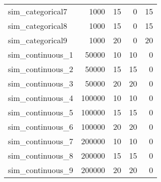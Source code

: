 \begin{tabular}{lrrrr}
  sim\_categorical7 & 1000 &  15 &   0 &  15 \\ 
  sim\_categorical8 & 1000 &  15 &   0 &  15 \\ 
  sim\_categorical9 & 1000 &  20 &   0 &  20 \\ 
  sim\_continuous\_1 & 50000 &  10 &  10 &   0 \\ 
  sim\_continuous\_2 & 50000 &  15 &  15 &   0 \\ 
  sim\_continuous\_3 & 50000 &  20 &  20 &   0 \\ 
  sim\_continuous\_4 & 100000 &  10 &  10 &   0 \\ 
  sim\_continuous\_5 & 100000 &  15 &  15 &   0 \\ 
  sim\_continuous\_6 & 100000 &  20 &  20 &   0 \\ 
  sim\_continuous\_7 & 200000 &  10 &  10 &   0 \\ 
  sim\_continuous\_8 & 200000 &  15 &  15 &   0 \\ 
  sim\_continuous\_9 & 200000 &  20 &  20 &   0 \\ 
   \bottomrule
\end{tabular}
